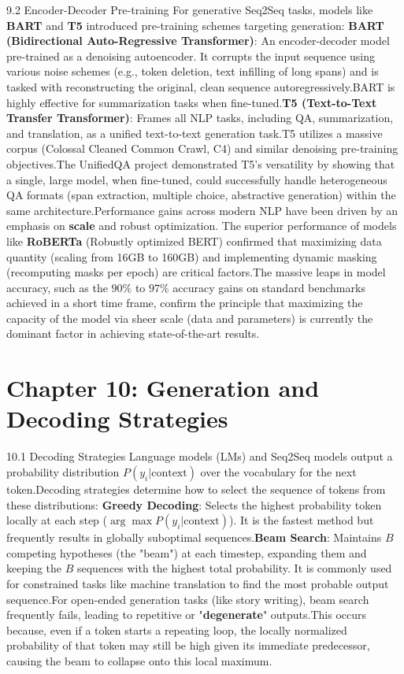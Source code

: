 \documentclass{article}
\begin{document}
9.2 Encoder-Decoder Pre-training
For generative Seq2Seq tasks, models like \textbf{BART} and \textbf{T5} introduced pre-training schemes targeting generation:
\textbf{BART (Bidirectional Auto-Regressive Transformer)}: An encoder-decoder model pre-trained as a denoising autoencoder. It corrupts the input sequence using various noise schemes (e.g., token deletion, text infilling of long spans) and is tasked with reconstructing the original, clean sequence autoregressively.\footnotemark[1] BART is highly effective for summarization tasks when fine-tuned.\footnotemark[1]
\textbf{T5 (Text-to-Text Transfer Transformer)}: Frames all NLP tasks, including QA, summarization, and translation, as a unified text-to-text generation task.\footnotemark[1] T5 utilizes a massive corpus (Colossal Cleaned Common Crawl, C4) and similar denoising pre-training objectives.\footnotemark[1] The UnifiedQA project demonstrated T5's versatility by showing that a single, large model, when fine-tuned, could successfully handle heterogeneous QA formats (span extraction, multiple choice, abstractive generation) within the same architecture.\footnotemark[1]
Performance gains across modern NLP have been driven by an emphasis on \textbf{scale} and robust optimization. The superior performance of models like \textbf{RoBERTa} (Robustly optimized BERT) confirmed that maximizing data quantity (scaling from 16GB to 160GB) and implementing dynamic masking (recomputing masks per epoch) are critical factors.\footnotemark[1] The massive leaps in model accuracy, such as the $90\%$ to $97\%$ accuracy gains on standard benchmarks achieved in a short time frame, confirm the principle that maximizing the capacity of the model via sheer scale (data and parameters) is currently the dominant factor in achieving state-of-the-art results.\footnotemark[1]

\section{Chapter 10: Generation and Decoding Strategies}
10.1 Decoding Strategies
Language models (LMs) and Seq2Seq models output a probability distribution $P(y_i|\text{context})$ over the vocabulary for the next token.\footnotemark[1] Decoding strategies determine how to select the sequence of tokens from these distributions:
\textbf{Greedy Decoding}: Selects the highest probability token locally at each step ($\arg\max P(y_i|\text{context})$). It is the fastest method but frequently results in globally suboptimal sequences.\footnotemark[1]
\textbf{Beam Search}: Maintains $B$ competing hypotheses (the "beam") at each timestep, expanding them and keeping the $B$ sequences with the highest total probability. It is commonly used for constrained tasks like machine translation to find the most probable output sequence.\footnotemark[1]
For open-ended generation tasks (like story writing), beam search frequently fails, leading to repetitive or "\textbf{degenerate}" outputs.\footnotemark[1] This occurs because, even if a token starts a repeating loop, the locally normalized probability of that token may still be high given its immediate predecessor, causing the beam to collapse onto this local maximum.\footnotemark[1]
\end{document}
